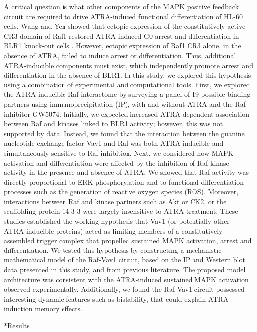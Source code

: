 \documentclass[12pt]{article}
\makeatletter
\renewcommand\section{\@startsection
	{subsection}{2}{0mm}
	{-0.2in}
	{0.05\baselineskip}
	{\normalfont\large\bfseries}}
\makeatother
\begin{document}
A critical question is what other components of the MAPK positive feedback circuit are required to drive ATRA-induced functional differentiation of HL-60 cells. 
Wang and Yen showed that ectopic expression of the constitutively active CR3 domain of Raf1 restored ATRA-induced G0 arrest and differentiation in BLR1 knock-out cells \cite{Wang2008}. 
However, ectopic expression of Raf1 CR3 alone, in the absence of ATRA, failed to induce arrest or differentiation.
Thus, additional ATRA-inducible components must exist, 
which independently promote arrest and differentiation in the absence of BLR1.
In this study, we explored this hypothesis using a combination of experimental and computational tools. 
First, we explored the ATRA-inducible Raf interactome 
by surveying a panel of 19 possible binding partners using immunoprecipitation (IP), 
with and without ATRA and the Raf inhibitor GW5074.  
Initially, we expected increased ATRA-dependent association between Raf and kinases linked to BLR1 activity; 
however, this was not supported by data.
Instead, we found that the interaction between the guanine nucleotide exchange factor Vav1 and Raf was both ATRA-inducible and simultaneously sensitive to Raf inhibition. 
Next, we considered how MAPK activation and differentiation were affected by the inhibition of Raf kinase activity in the presence and absence of ATRA.
We showed that Raf activity was directly proportional to ERK phosphorylation and to functional differentiation processes such as the generation of reactive oxygen species (ROS). 
Moreover, interactions between Raf and kinase partners such as Akt or CK2, or the scaffolding protein 14-3-3 were largely insensitive to ATRA treatment. 
These studies established the working hypothesis that Vav1 (or potentially other ATRA-inducible proteins) acted as limiting members of a constitutively assembled trigger complex that propelled sustained MAPK activation, arrest and differentiation.   
We tested this hypothesis by constructing a mechanistic mathematical model of the Raf-Vav1 circuit, 
based on the IP and Western blot data presented in this study, 
and from previous literature. 
The proposed model architecture was consistent with the ATRA-induced sustained MAPK activation observed experimentally. 
Additionally, we found the Raf-Vav1 circuit possessed interesting dynamic features such as bistability, 
that could explain ATRA-induction memory effects.

\clearpage

\section*{Results}
\end{document}
